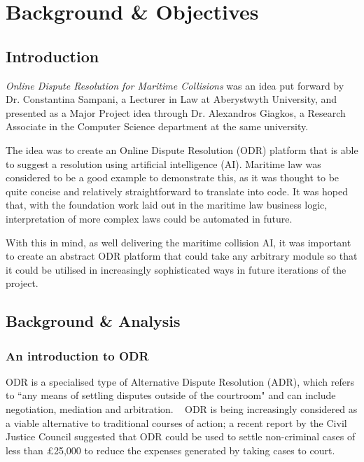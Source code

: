 \chapter{Background \& Objectives}

\section{Introduction}

\emph{Online Dispute Resolution for Maritime Collisions} was an idea put forward by Dr. Constantina Sampani, a Lecturer in Law at Aberystwyth University, and presented as a Major Project idea through Dr. Alexandros Giagkos, a Research Associate in the Computer Science department at the same university.

The idea was to create an Online Dispute Resolution (ODR) platform that is able to suggest a resolution using artificial intelligence (AI). Maritime law was considered to be a good example to demonstrate this, as it was thought to be quite concise and relatively straightforward to translate into code. It was hoped that, with the foundation work laid out in the maritime law business logic, interpretation of more complex laws could be automated in future.

With this in mind, as well delivering the maritime collision AI, it was important to create an abstract ODR platform that could take any arbitrary module so that it could be utilised in increasingly sophisticated ways in future iterations of the project.

\section{Background \& Analysis}

\subsection{An introduction to ODR}

ODR is a specialised type of Alternative Dispute Resolution (ADR), which refers to ``any means of settling disputes outside of the courtroom" and can include negotiation, mediation and arbitration. ~\cite{define:ADR} ODR is being increasingly considered as a viable alternative  to traditional courses of action; a recent report by the Civil Justice Council suggested that ODR could be used to settle non-criminal cases of less than \pounds25,000 to reduce the expenses generated by taking cases to court.~\cite{report:odrPopular}

